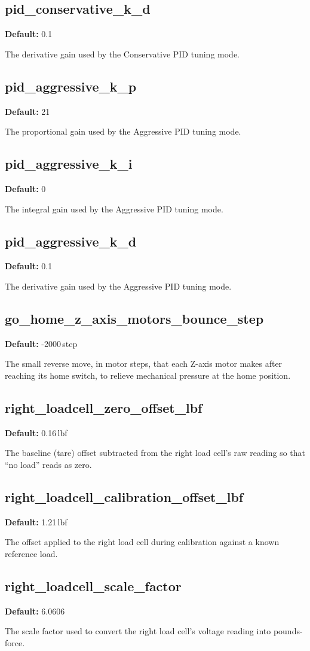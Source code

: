 \documentclass[12pt]{report}
\newcommand{\defaultval}[1]{\noindent\textbf{Default:} #1\par\smallskip\noindent}
\begin{document}
\subsection{pid\_conservative\_k\_d}
\defaultval{0.1}
The derivative gain used by the Conservative PID tuning mode.

\subsection{pid\_aggressive\_k\_p}
\defaultval{21}
The proportional gain used by the Aggressive PID tuning mode.

\subsection{pid\_aggressive\_k\_i}
\defaultval{0}
The integral gain used by the Aggressive PID tuning mode.

\subsection{pid\_aggressive\_k\_d}
\defaultval{0.1}
The derivative gain used by the Aggressive PID tuning mode.

\subsection{go\_home\_z\_axis\_motors\_bounce\_step}
\defaultval{-2000\,step}
The small reverse move, in motor steps, that each Z-axis motor makes after reaching its home switch, to relieve mechanical pressure at the home position.

\subsection{right\_loadcell\_zero\_offset\_lbf}
\defaultval{0.16\,lbf}
The baseline (tare) offset subtracted from the right load cell's raw reading so that ``no load'' reads as zero.

\subsection{right\_loadcell\_calibration\_offset\_lbf}
\defaultval{1.21\,lbf}
The offset applied to the right load cell during calibration against a known reference load.

\subsection{right\_loadcell\_scale\_factor}
\defaultval{6.0606}
The scale factor used to convert the right load cell's voltage reading into pounds-force.
\end{document}
